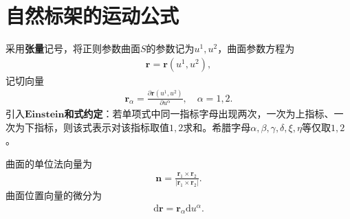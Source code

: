 \documentclass[../../main.tex]{subfiles}%
\begin{document}
\section{自然标架的运动公式}

\begin{definition}
采用\textbf{张量}记号，将正则参数曲面$S$的参数记为$u^1,u^2$，曲面参数方程为
\begin{align}
\boldsymbol{r}=\boldsymbol{r}(u^1,u^2),\label{eq:tensor_param}
\end{align}
记切向量
\begin{align}
\boldsymbol{r}_\alpha=\frac{\partial \boldsymbol{r}(u^1,u^2)}{\partial u^\alpha},\quad \alpha=1,2.\label{eq:tangent_tensor}
\end{align}
引入$\mathbf{Einstein}$\textbf{和式约定}：若单项式中同一指标字母出现两次，一次为上指标、一次为下指标，则该式表示对该指标取值$1,2$求和。希腊字母$\alpha,\beta,\gamma,\delta,\xi,\eta$等仅取$1,2$。

曲面的单位法向量为
\begin{align}
\boldsymbol{n}=\frac{\boldsymbol{r}_1\times\boldsymbol{r}_2}{|\boldsymbol{r}_1\times\boldsymbol{r}_2|}.\label{eq:normal_tensor}
\end{align}
曲面位置向量的微分为
\begin{align}
\mathrm{d}\boldsymbol{r}=\boldsymbol{r}_\alpha\mathrm{d}u^\alpha.\label{eq:dr_tensor}
\end{align}
\end{definition}
\end{document}
